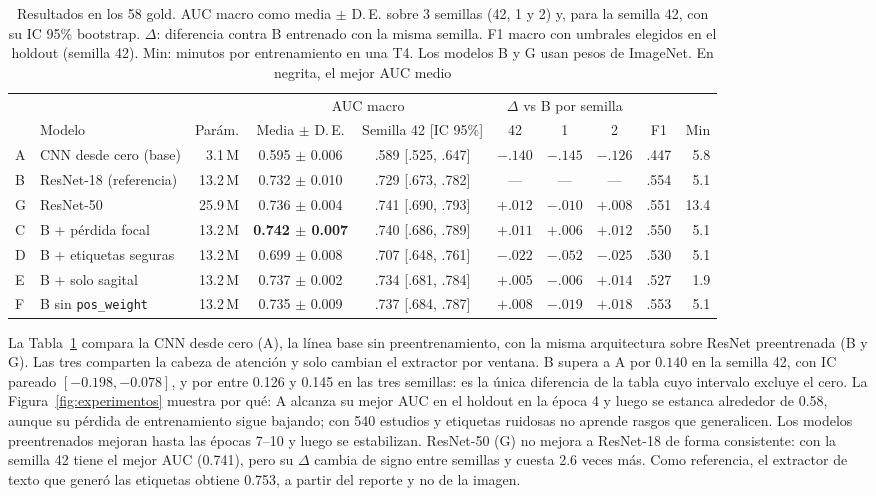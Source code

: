 \documentclass{article}
\begin{document}
\begin{table}[t]
  \caption{Resultados en los 58 gold. AUC macro como media $\pm$ D.\,E. sobre 3 semillas (42, 1 y 2) y, para la semilla 42, con su IC 95\% bootstrap.
    $\Delta$: diferencia contra B entrenado con la misma semilla. F1 macro con umbrales elegidos en el holdout (semilla 42). Min: minutos por entrenamiento en una T4. Los modelos B y G usan pesos de ImageNet.
    En negrita, el mejor AUC medio}
  \label{tab:resultados}
  \centering
  \footnotesize
  \setlength{\tabcolsep}{2.5pt}
  \begin{tabular}{@{}llrccccccr@{}}
    \toprule
    & & & \multicolumn{2}{c}{AUC macro} & \multicolumn{3}{c}{$\Delta$ vs B por semilla} & & \\
    \cmidrule(lr){4-5} \cmidrule(lr){6-8}
    & Modelo & Parám. & Media $\pm$ D.\,E. & Semilla 42 [IC 95\%] & 42 & 1 & 2 & F1 & Min \\
    \midrule
    A & CNN desde cero (base) &  3.1\,M & 0.595 $\pm$ 0.006 & .589 [.525, .647] & $-.140$ & $-.145$ & $-.126$ & .447 &  5.8 \\
    B & ResNet-18 (referencia) & 13.2\,M & 0.732 $\pm$ 0.010 & .729 [.673, .782] & --- & --- & --- & .554 & 5.1 \\
    G & ResNet-50 & 25.9\,M & 0.736 $\pm$ 0.004 & .741 [.690, .793] & $+.012$ & $-.010$ & $+.008$ & .551 & 13.4 \\
    \midrule
    C & B + pérdida focal & 13.2\,M & \textbf{0.742 $\pm$ 0.007} & .740 [.686, .789] & $+.011$ & $+.006$ & $+.012$ & .550 & 5.1 \\
    D & B + etiquetas seguras & 13.2\,M & 0.699 $\pm$ 0.008 & .707 [.648, .761] & $-.022$ & $-.052$ & $-.025$ & .530 & 5.1 \\
    E & B + solo sagital & 13.2\,M & 0.737 $\pm$ 0.002 & .734 [.681, .784] & $+.005$ & $-.006$ & $+.014$ & .527 & 1.9 \\
    F & B sin \texttt{pos\_weight} & 13.2\,M & 0.735 $\pm$ 0.009 & .737 [.684, .787] & $+.008$ & $-.019$ & $+.018$ & .553 & 5.1 \\
    \bottomrule
  \end{tabular}
\end{table}

La Tabla~\ref{tab:resultados} compara la CNN desde cero (A), la línea base sin preentrenamiento, con la misma arquitectura sobre ResNet preentrenada (B y G).
Las tres comparten la cabeza de atención y solo cambian el extractor por ventana.
B supera a A por $0.140$ en la semilla 42, con IC pareado $[-0.198, -0.078]$, y por entre 0.126 y 0.145 en las tres semillas: es la única diferencia de la tabla cuyo intervalo excluye el cero.
La Figura~\ref{fig:experimentos} muestra por qué: A alcanza su mejor AUC en el holdout en la época 4 y luego se estanca alrededor de 0.58, aunque su pérdida de entrenamiento sigue bajando; con 540 estudios y etiquetas ruidosas no aprende rasgos que generalicen.
Los modelos preentrenados mejoran hasta las épocas 7--10 y luego se estabilizan.
ResNet-50 (G) no mejora a ResNet-18 de forma consistente: con la semilla 42 tiene el mejor AUC (0.741), pero su $\Delta$ cambia de signo entre semillas y cuesta 2.6 veces más.
Como referencia, el extractor de texto que generó las etiquetas obtiene 0.753, a partir del reporte y no de la imagen.
\end{document}
